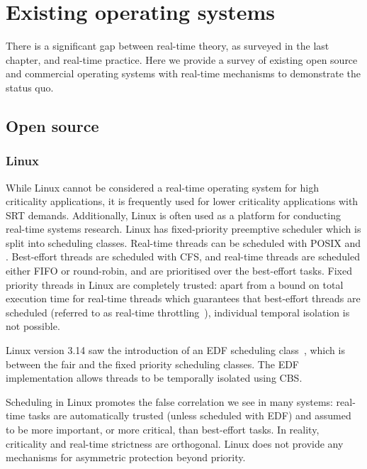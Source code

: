 \section{Existing operating systems}

There is a significant gap between real-time theory, as surveyed in the last chapter, and real-time
practice. Here we provide a survey of existing open source and commercial operating systems with
real-time mechanisms to demonstrate the status quo.

\subsection{Open source}

\subsubsection{Linux}

While Linux cannot be considered a real-time operating system for high criticality applications, it
is frequently used for lower criticality applications with \gls{SRT} demands.  Additionally, Linux
is often used as a platform for conducting real-time systems research. 
Linux has fixed-priority preemptive scheduler which is split into scheduling classes.  Real-time
threads can be scheduled with \gls{POSIX} \schedfifo and \schedsporadic. Best-effort threads are
scheduled with \gls{CFS}, and real-time threads are scheduled either \gls{FIFO} or round-robin, and
are prioritised over the best-effort tasks.  Fixed priority threads in Linux are completely trusted:
apart from a bound on total execution time for real-time threads which guarantees that best-effort
threads are scheduled (referred to as real-time throttling~\citep{Corbet_08}), individual temporal
isolation is not possible.

Linux version 3.14 saw the introduction of an \gls{EDF} scheduling class~\citep{Corbet_09},
which is between the fair and the fixed priority scheduling classes.  The \gls{EDF} implementation
allows threads to be temporally isolated using \gls{CBS}.

Scheduling in Linux promotes the false correlation we see in many systems: real-time tasks are
automatically trusted (unless scheduled with \gls{EDF}) and assumed to be more important, or more
critical, than best-effort tasks.  In reality, criticality and real-time strictness are orthogonal.
Linux does not provide any mechanisms for asymmetric protection beyond priority.


